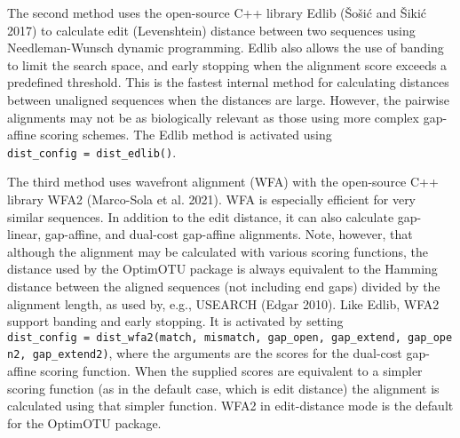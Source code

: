 \documentclass[
]{article}
\begin{document}
The second method uses the open-source C++ library Edlib (Šošić and Šikić 2017) to calculate edit (Levenshtein) distance between two sequences using Needleman-Wunsch dynamic programming.
Edlib also allows the use of banding to limit the search space, and early stopping when the alignment score exceeds a predefined threshold.
This is the fastest internal method for calculating distances between unaligned sequences when the distances are large.
However, the pairwise alignments may not be as biologically relevant as those using more complex gap-affine scoring schemes.
The Edlib method is activated using \texttt{dist\_config\ =\ dist\_edlib()}.

The third method uses wavefront alignment (WFA) with the open-source C++ library WFA2 (Marco-Sola et al. 2021).
WFA is especially efficient for very similar sequences.
In addition to the edit distance, it can also calculate gap-linear, gap-affine, and dual-cost gap-affine alignments.
Note, however, that although the alignment may be calculated with various scoring functions, the distance used by the OptimOTU package is always equivalent to the Hamming distance between the aligned sequences (not including end gaps) divided by the alignment length, as used by, e.g., USEARCH (Edgar 2010).
Like Edlib, WFA2 support banding and early stopping.
It is activated by setting \texttt{dist\_config\ =\ dist\_wfa2(match,\ mismatch,\ gap\_open,\ gap\_extend,\ gap\_open2,\ gap\_extend2)}, where the arguments are the scores for the dual-cost gap-affine scoring function.
When the supplied scores are equivalent to a simpler scoring function (as in the default case, which is edit distance) the alignment is calculated using that simpler function.
WFA2 in edit-distance mode is the default for the OptimOTU package.
\end{document}
